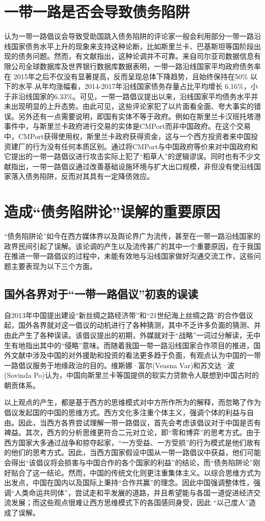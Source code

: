 \documentclass[a4paper,UTF8]{article}
\begin{document}
	\section{一带一路是否会导致债务陷阱}
		认为一带一路倡议会导致受助国跳入债务陷阱的评论家一般会利用部分一带一路沿线国家债务水平上升的现象来支持这种论断，比如斯里兰卡、巴基斯坦等国阶段出现的债务问题。然而，有文献指出，这种论调并不可靠。来自司尔亚司数据信息有限公司全球数据库及世界银行数据库数据表明，一带一路沿线国家平均政府债务率在 2015年之后不仅没有显著提高，反而呈现总体下降趋势，且始终保持在50\% 以下的水平.从年均涨幅看，2014-2017年沿线国家债务存量占比平均增长 6.16\%，小于非沿线国家的6.33\%。可见，一带一路倡议提出以来，沿线国家平均债务水平并未出现明显的上升态势。由此可见，这些评论家犯了以片面看全面、夸大事实的错误。另外还有一点需要说明，即国有实体不等于政府。例如在斯里兰卡汉班托塔港事件中，与斯里兰卡政府进行交易的实体是CMPort而非中国政府。在这个交易中，CMPort获得使用权，斯里兰卡政府获得资金，这与一个西方投资者来中国投资建厂的行为没有任何本质区别。通过将CMPort与中国政府等价来对中国政府和它提出的一带一路倡议进行攻击实际上犯了“稻草人”的逻辑谬误。同时也有不少文献指出，一带一路倡议通过改善基础设施环境与扩大出口规模，非但没有使沿线国家落入债务陷阱，反而对其具有一定降债效应。
	\section{造成“债务陷阱论”误解的重要原因}
		“债务陷阱论”如今在西方媒体界以及舆论界广为流传，甚至在一带一路沿线国家的政界民间引起了误解。该论调的产生以及流传甚广的其中一个重要原因，在于我国在推进一带一路倡议的过程中，未能有效地与沿线国家做好沟通交流工作，这些问题主要表现为以下三个方面。
		
		\subsection{国外各界对于“一带一路倡议”初衷的误读}
			自2013年中国提出建设“新丝绸之路经济带”和“21世纪海上丝绸之路”的合作倡议起，国外各界就对这一倡议的动机进行了各种猜测，其中不乏许多负面的猜测、并由此产生了各种误读。该倡议提出的初期，外媒就对于“战略”一词过分解读，无中生有地指出其中的“侵略”意味。而随着我国一带一路沿线国家合作项目的推进，国外文献中涉及中国的对外援助和投资的看法更多趋于负面，有观点认为中国的一带一路倡议服务于地缘政治的目的。维斯娜·富尔(Veasna Var)和苏文达·波(Sovinda Po)认为，中国向斯里兰卡等国提供的软实力贷款令人联想到中国古时的朝贡体系。
		
			以上观点的产生，都是基于西方的思维模式对中方所作所为的解释，而忽略了作为倡议发起国的中国的思维方式。西方文化多注重个体主义，强调个体的利益与自由。因此，当西方各界尝试理解一带一路倡议，首先会考虑该倡议对于中国是否有裨益。其次，西方的分析思维更符合二元对立论，即“零和博弈”的思考方式。由于西方国家大多通过战争和掠夺起家，“一方受益、一方受损”的行为模式是他们故有的他们的思考方式。因此，当西方国家假设中国从一带一路倡议中获益，他们可能会得出“该倡议将会损害与中国合作的各个国家的利益”的结论，而“债务陷阱论”刚好贴合了这一结论。然而，中国的传统文化则更注重集体主义。以综合思维方式为出发点，中国在国内以及国际上秉持“合作共赢”的理念。因此中国强调整体性，强调“人类命运共同体”，尝试走和平发展的道路，并且希望能与各国一道促进经济交流发展；而这些观点很难让西方思维模式下的各国感同身受，因此 “以己度人”造成了误解。
		
\end{document}
